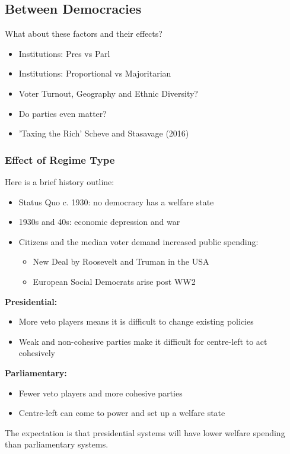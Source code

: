 \documentclass[12pt, letterpaper]{article}
\begin{document}
\subsection{Between Democracies}
What about these factors and their effects?
\begin{itemize}
	\item Institutions: Pres vs Parl
	\item Institutions: Proportional vs Majoritarian
	\item Voter Turnout, Geography and Ethnic Diversity?
	\item Do parties even matter?
	\item 'Taxing the Rich' Scheve and Stasavage (2016)
\end{itemize}

\subsubsection{Effect of Regime Type}
Here is a brief history outline:
\begin{itemize}
	\item Status Quo c. 1930: no democracy has a welfare state
	\item 1930s and 40s: economic depression and war
	\item Citizens and the median voter demand increased public spending:
		\begin{itemize}
			\item New Deal by Roosevelt and Truman in the USA
			\item European Social Democrats arise post WW2
		\end{itemize}
\end{itemize}
\textbf{Presidential:}
\begin{itemize}
	\item More veto players means it is difficult to change existing policies
	\item Weak and non-cohesive parties make it difficult for centre-left to act cohesively
\end{itemize}
\textbf{Parliamentary:}
\begin{itemize}
	\item Fewer veto players and more cohesive parties
	\item Centre-left can come to power and set up a welfare state
\end{itemize}
The expectation is that presidential systems will have lower welfare spending than parliamentary systems.
\end{document}

